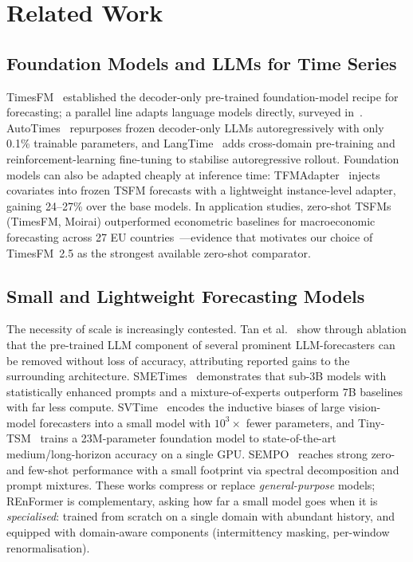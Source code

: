 \documentclass[10pt,twocolumn]{article}
\begin{document}
\section{Related Work}

\subsection{Foundation Models and LLMs for Time Series}

TimesFM~\cite{das2024timesfm} established the decoder-only pre-trained
foundation-model recipe for forecasting; a parallel line adapts language
models directly, surveyed in~\cite{zhang2024survey}.
AutoTimes~\cite{liu2024autotimes} repurposes frozen decoder-only LLMs
autoregressively with only 0.1\% trainable parameters, and
LangTime~\cite{niu2025langtime} adds cross-domain pre-training and
reinforcement-learning fine-tuning to stabilise autoregressive rollout.
Foundation models can also be adapted cheaply at inference time:
TFMAdapter~\cite{dange2025tfmadapter} injects covariates into frozen
TSFM forecasts with a lightweight instance-level adapter, gaining
24--27\% over the base models. In application studies, zero-shot TSFMs
(TimesFM, Moirai) outperformed econometric baselines for macroeconomic
forecasting across 27 EU countries~\cite{katharakis2025slm}---evidence
that motivates our choice of TimesFM~2.5 as the strongest available
zero-shot comparator.

\subsection{Small and Lightweight Forecasting Models}

The necessity of scale is increasingly contested. Tan et
al.~\cite{tan2024useful} show through ablation that the pre-trained LLM
component of several prominent LLM-forecasters can be removed without
loss of accuracy, attributing reported gains to the surrounding
architecture. SMETimes~\cite{fan2025smetimes} demonstrates that sub-3B
models with statistically enhanced prompts and a mixture-of-experts
outperform 7B baselines with far less compute.
SVTime~\cite{shen2025svtime} encodes the inductive biases of large
vision-model forecasters into a small model with $10^3\times$ fewer
parameters, and Tiny-TSM~\cite{birkel2025tinytsm} trains a 23M-parameter
foundation model to state-of-the-art medium/long-horizon accuracy on a
single GPU. SEMPO~\cite{he2025sempo} reaches strong zero- and few-shot
performance with a small footprint via spectral decomposition and
prompt mixtures. These works compress or replace \emph{general-purpose}
models; REnFormer is complementary, asking how far a small model goes
when it is \emph{specialised}: trained from scratch on a single domain
with abundant history, and equipped with domain-aware components
(intermittency masking, per-window renormalisation).
\end{document}
